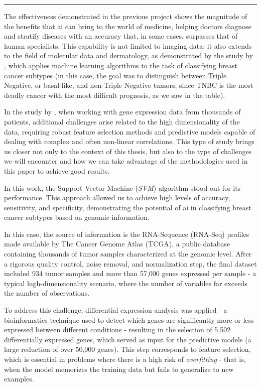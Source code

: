 \noindent\rule{\linewidth}{0.4pt}

The effectiveness demonstrated in the previous project shows the magnitude of
the benefits that \gls{ai} can bring to the world of medicine, helping doctors
diagnose and stratify diseases with an accuracy that, in some cases, surpasses
that of human specialists. This capability is not limited to imaging data: it
also extends to the field of molecular data and dermatology, as demonstrated by
the study by \textcite{bca_subtypes_with_ml_Wu_2021}, which applies machine
learning algorithms to the task of classifying breast cancer subtypes (in this
case, the goal was to distinguish between Triple Negative, or basal-like, and
non-Triple Negative tumors, since TNBC is the most deadly cancer with the most
difficult prognosis, as we saw in the table).

In the study by \textcite{bca_subtypes_with_ml_Wu_2021}, when working with gene
expression data from thousands of patients, additional challenges arise related
to the high dimensionality of the data, requiring robust feature selection
methods and predictive models capable of dealing with complex and often
non-linear correlations. This type of study brings us closer not only to the
context of this thesis, but also to the type of challenges we will encounter
and how we can take advantage of the methodologies used in this paper to
achieve good results.

In this work, the Support Vector Machine (\textit{SVM}) algorithm stood out for
its performance. This approach allowed us to achieve high levels of accuracy,
sensitivity, and specificity, demonstrating the potential of \gls{ai} in
classifying breast cancer subtypes based on genomic information.

In this case, the source of information is the RNA-Sequence (RNA-Seq) profiles
made available by The Cancer Genome Atlas (TCGA), a public database containing
thousands of tumor samples characterized at the genomic level. After a rigorous
quality control, noise removal, and normalization step, the final dataset
included 934 tumor samples and more than 57{,}000 genes expressed per sample -
a typical high-dimensionality scenario, where the number of variables far
exceeds the number of observations.

To address this challenge, differential expression analysis was applied - a
bioinformatics technique used to detect which genes are significantly more or
less expressed between different conditions - resulting in the selection of
5{,}502 differentially expressed genes, which served as input for the
predictive models (a large reduction of over 50{,}000 genes). This step
corresponds to feature selection, which is essential in problems where there is
a high risk of \textit{overfitting} - that is, when the model memorizes the
training data but fails to generalize to new examples.

